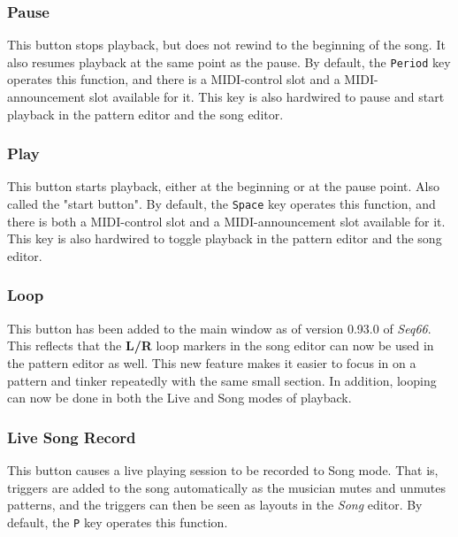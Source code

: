 \subsubsection{Pause}
\label{subsubsec:introduction_pause_button}

   This button stops playback, but does not rewind to the beginning of the
   song.  It also resumes playback at the same point as the pause.  By default,
   the \texttt{Period} key operates this function, and there is a MIDI-control
   slot and a MIDI-announcement slot available for it.  This key is also
   hardwired to pause and start playback in the pattern editor and the song
   editor.

\subsubsection{Play}
\label{subsubsec:introduction_play_button}

   This button starts playback, either at the beginning or at the pause point.
   Also called the "start button".
   By default, the \texttt{Space} key operates this function,
   and there is both a MIDI-control slot and a MIDI-announcement slot
   available for it.
   This key is also hardwired to toggle playback in the pattern editor and the
   song editor.

\subsubsection{Loop}
\label{subsubsec:introduction_loop_button}

   This button has been added to the main window as of version 0.93.0 of
   \textsl{Seq66}.
   This reflects that the \textbf{L/R} loop markers in the song editor can now
   be used in the pattern editor as well.  This new feature makes it easier to
   focus in on a pattern and tinker repeatedly with the same small section.
   In addition, looping can now be done in both the Live and Song modes of
   playback.

\subsubsection{Live Song Record}
\label{subsubsec:introduction_live_record_button}

   This button causes a live playing session to be recorded to Song mode.
   That is, triggers are added to the song automatically as the musician mutes
   and unmutes patterns, and the triggers can then be
   seen as layouts in the \textsl{Song} editor.
   By default, the \texttt{P} key operates this function.

